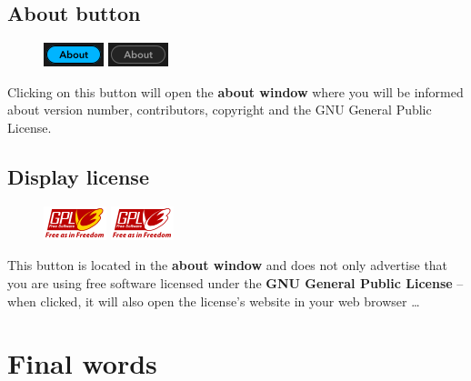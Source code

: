 \section{About button}

\begin{figure}
  \includegraphics[scale=\screenshotscale,clip]{include/images/button_about_on.png}
  \newline \vspace{-0.9\baselineskip}
  \includegraphics[scale=\screenshotscale,clip]{include/images/button_about_off.png}
\end{figure}

Clicking on this button will open the \textbf{about window} where you
will be informed about version number, contributors, copyright and the
GNU General Public License.

\section{Display license}

\begin{figure}
  \includegraphics[scale=\screenshotscale,clip]{include/images/button_gpl_on.png}
  \newline \vspace{-0.9\baselineskip}
  \includegraphics[scale=\screenshotscale,clip]{include/images/button_gpl_off.png}
\end{figure}

This button is located in the \textbf{about window} and does not only
advertise that you are using free software licensed under the
\textbf{GNU General Public License} -- when clicked, it will also open
the license's website in your web browser \dots

\chapter{Final words}
\label{chap:final_words}

